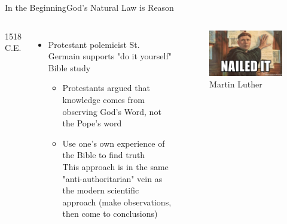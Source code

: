 \begin{frame}{In the Beginning}{God's Natural Law is Reason}
	\begin{columns}[c]
			1518 C.E.
			\begin{itemize}
				\item Protestant polemicist St. Germain supports "do it yourself" Bible study
					\begin{itemize}
						\item Protestants argued that knowledge comes from observing God's Word, not the Pope's word
						\item Use one's own experience of the Bible to find truth\\
							This approach is in the same "anti-authoritarian" vein as the modern scientific approach (make observations, then come to conclusions)
					\end{itemize}
			\end{itemize}
			\begin{figure}
				\centering
				\includegraphics[width=\textwidth]{images/martin_luther}
				\caption{Martin Luther}
			\end{figure}
	\end{columns}
\end{frame}


